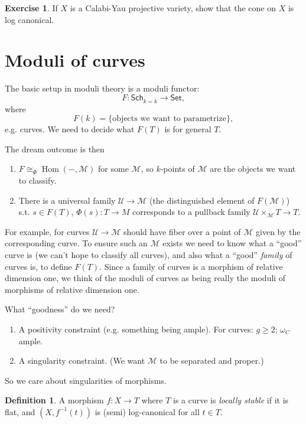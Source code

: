 \documentclass{article}
\theoremstyle{definition}
\newtheorem*{definition}{Definition}
\newtheorem*{exercise}{Exercise}
\DeclareMathOperator{\Hom}{Hom}
\newcommand{\closure}[1]{\overline{#1}}
\newcommand{\cat}[1]{\mathsf{#1}}
\newcommand{\U}{\mathcal{U}}
\newcommand{\M}{\mathcal{M}}
\begin{document}
\begin{exercise}
    If $X$ is a Calabi-Yau projective variety, show that the cone on $X$ is log
    canonical.
\end{exercise}

\section*{Moduli of curves}

The basic setup in moduli theory is a moduli functor:
\begin{equation*}
    F : \cat{Sch}_{k=\closure k}\to\cat{Set},
\end{equation*}
where
\begin{equation*}
    F(k) = \{\text{objects we want to parametrize}\},
\end{equation*}
e.g. curves. We need to decide what $F(T)$ is for general $T$.

The dream outcome is then
\begin{enumerate}[label=(\Roman*)]
    \item $F\cong_\Phi\Hom(-,\M)$ for some $\M$, so $k$-points of $\M$ are the
        objects we want to classify.
    \item There is a universal family $\U\to\M$ (the distinguished element of
        $F(\M)$) s.t. $s\in F(T)$, $\Phi(s):T\to M$ corresponds to a pullback
        family $\U\times_\M T\to T$.
\end{enumerate}
For example, for curves $\U\to\M$ should have fiber over a point of $\M$ given
by the corresponding curve. To ensure such an $\M$ exists we need to know what a
``good'' curve is (we can't hope to classify all curves), and also what a
``good'' \emph{family} of curves is, to define $F(T)$. Since a family of curves
is a morphism of relative dimension one, we think of the moduli of curves as
being really the moduli of morphisms of relative dimension one.

What ``goodness'' do we need?
\begin{enumerate}[label=\arabic*)]
    \item A positivity constraint (e.g. something being ample).
        For curves: $g\ge2$; $\omega_C$ ample.

    \item A singularity constraint. (We want $\M$ to be separated and proper.)
\end{enumerate}
So we care about singularities of morphisms.

\begin{definition}
    A morphism $f:X\to T$ where $T$ is a curve is \emph{locally stable} if it is
    flat, and $(X,f^{-1}(t))$ is (semi) log-canonical for all $t\in T$.
\end{definition}
\end{document}
